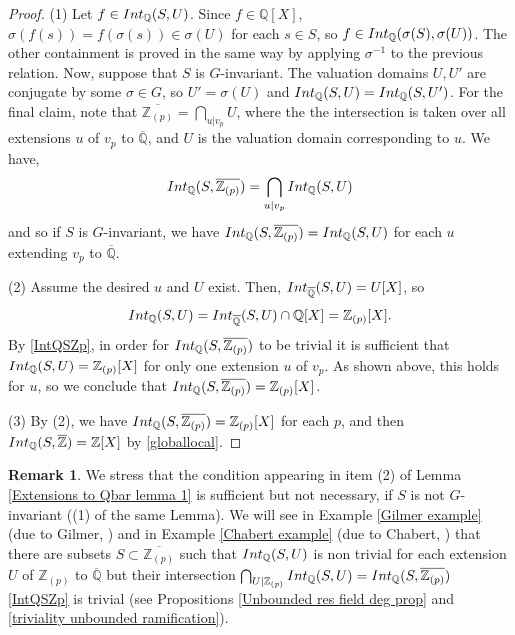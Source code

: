 \documentclass{article}
\theoremstyle{definition}\newtheorem{Def}[equation]{Definition}
\newtheorem{Rem}[equation]{Remark}
\theoremstyle{definition}\newtheorem{Ques}[equation]{Question}
\theoremstyle{definition}\newtheorem{Conj}[equation]{Conjecture}
\theoremstyle{definition}\newtheorem{Not}[equation]{Notation}
\newcommand{\Q}{\mathbb{Q}}
\newcommand{\oQ}{\overline{\Q}}
\newcommand{\oZ}{\overline{\Z}}
\newcommand{\Z}{\mathbb{Z}}
\newcommand{\Int}{\textnormal{Int}}
\newcommand{\IntQ}{\Int_{\Q}}
\numberwithin{equation}{section}
\begin{document}
\begin{proof}
(1)  Let $f\in\IntQ(S,U)$. Since $f \in \Q[X]$, $\sigma(f(s))=f(\sigma(s))\in \sigma(U)$ for each $s \in S$, so $f\in \IntQ(\sigma(S),\sigma(U))$. The other containment is proved in the same way by applying $\sigma^{-1}$ to the previous relation. Now, suppose that $S$ is $G$-invariant. The valuation domains $U,U'$ are conjugate by some $\sigma\in G$, so $U'=\sigma(U)$ and $\IntQ(S,U)=\IntQ(S,U')$. For the final claim, note that $\overline{\Z_{(p)}}=\bigcap_{u|v_p}U$, where the the intersection is taken over all extensions $u$ of $v_p$ to $\oQ$, and $U$ is the valuation domain corresponding to $u$. We have,
\begin{equation}\label{IntQSZp}
\IntQ(S,\overline{\Z_{(p)}})=\bigcap_{u|v_p}\IntQ(S,U)    
\end{equation}
and so if $S$ is $G$-invariant, we have $\IntQ(S,\overline{\Z_{(p)}})=\IntQ(S,U)$ for each $u$ extending $v_p$ to $\oQ$.


(2) Assume the desired $u$ and $U$ exist. Then, $\Int_{\oQ}(S,U) = U[X]$, so
\begin{equation*}
\IntQ(S,U) = \Int_{\oQ}(S,U) \cap \Q[X] = \Z_{(p)}[X].
\end{equation*}
By \eqref{IntQSZp}, in order for $\IntQ(S,\overline{\Z_{(p)}})$ to be trivial it is sufficient that $\IntQ(S,U)=\Z_{(p)}[X]$ for only one extension $u$ of $v_p$. As shown above, this holds for $u$, so we conclude that $\IntQ(S,\overline{\Z_{(p)}}) = \Z_{(p)}[X]$.

(3) By (2), we have $\IntQ(S, \overline{\Z_{(p)}}) = \Z_{(p)}[X]$ for each $p$, and then $\IntQ(S,\oZ) = \Z[X]$ by \eqref{globallocal}.
\end{proof}

\begin{Rem}
We stress that the condition appearing in item (2) of Lemma \ref{Extensions to Qbar lemma 1} is sufficient but not necessary, if $S$ is not $G$-invariant ((1) of the same Lemma). We will see in Example \ref{Gilmer example} (due to Gilmer, \cite[Example 14]{GilmEx}) and in Example \ref{Chabert example}  (due to Chabert, \cite[Example 6.2]{ChabEx}) that there are subsets $S\subset \overline{\Z_{(p)}}$ such that $\IntQ(S,U)$ is non trivial for each extension $U$ of $\Z_{(p)}$ to $\oQ$ but their intersection $\bigcap_{U|\Z_{(p)}}\IntQ(S,U)=\IntQ(S,\overline{\Z_{(p)}})$ \eqref{IntQSZp} is trivial (see Propositions \ref{Unbounded res field deg prop} and  \ref{triviality unbounded ramification}).
\end{Rem}
\end{document}
